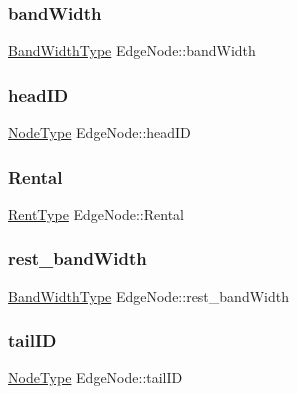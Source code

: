 \subsubsection{\texorpdfstring{band\+Width}{bandWidth}}
{\footnotesize\ttfamily \hyperlink{limorton___graph_8h_af75ec072bd23242821f5cdbeea6f64de}{Band\+Width\+Type} Edge\+Node\+::band\+Width}

\mbox{\label{struct_edge_node_af3bed43ba69a11f72fdc3dcbbcf85134}} 
\subsubsection{\texorpdfstring{head\+ID}{headID}}
{\footnotesize\ttfamily \hyperlink{limorton___graph_8h_a1b1a96beadaa686056e47989bf2a037e}{Node\+Type} Edge\+Node\+::head\+ID}

\mbox{\label{struct_edge_node_a8049f8b75c86bacee0e050fa405cbe63}} 
\subsubsection{\texorpdfstring{Rental}{Rental}}
{\footnotesize\ttfamily \hyperlink{limorton___graph_8h_a1f3d1d745c99aef46faa0e3d7338470e}{Rent\+Type} Edge\+Node\+::\+Rental}

\mbox{\label{struct_edge_node_a1e153bef71e62cbb99cbb5db422fca9b}} 
\subsubsection{\texorpdfstring{rest\+\_\+band\+Width}{rest\_bandWidth}}
{\footnotesize\ttfamily \hyperlink{limorton___graph_8h_af75ec072bd23242821f5cdbeea6f64de}{Band\+Width\+Type} Edge\+Node\+::rest\+\_\+band\+Width}

\mbox{\label{struct_edge_node_afca78cdb32caff602631b2558129fcc4}} 
\subsubsection{\texorpdfstring{tail\+ID}{tailID}}
{\footnotesize\ttfamily \hyperlink{limorton___graph_8h_a1b1a96beadaa686056e47989bf2a037e}{Node\+Type} Edge\+Node\+::tail\+ID}

